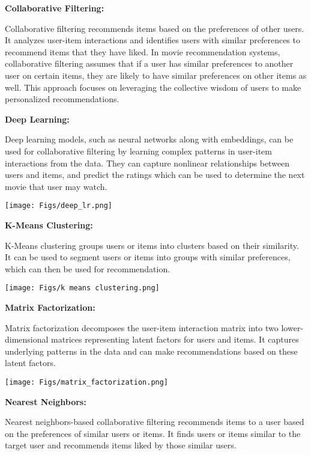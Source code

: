 \documentclass[a4paper]{article}
\theoremstyle{plain}
\theoremstyle{definition}
\begin{document}
\bigskip

\textbf{\Large Collaborative Filtering:}
\bigskip


Collaborative filtering recommends items based on the preferences of other users. It analyzes user-item interactions and identifies users with similar preferences to recommend items that they have liked. In movie recommendation systems, collaborative filtering assumes that if a user has similar preferences to another user on certain items, they are likely to have similar preferences on other items as well. This approach focuses on leveraging the collective wisdom of users to make personalized recommendations.

\bigskip

\textbf{\large \color[RGB]{50,50,50} Deep Learning:}

Deep learning models, such as neural networks along with embeddings, can be used for collaborative filtering by learning complex patterns in user-item interactions from the data. They can capture nonlinear relationships between users and items, and predict the ratings which can be used to determine the next movie that user may watch.

\texttt{[image: Figs/deep\_lr.png]}

\bigskip
\textbf{\large \color[RGB]{50,50,50} K-Means Clustering:}

K-Means clustering groups users or items into clusters based on their similarity. It can be used to segment users or items into groups with similar preferences, which can then be used for recommendation.

\texttt{[image: Figs/k means clustering.png]}

\bigskip
\textbf{\large \color[RGB]{50,50,50} Matrix Factorization:}


Matrix factorization decomposes the user-item interaction matrix into two lower-dimensional matrices representing latent factors for users and items. It captures underlying patterns in the data and can make recommendations based on these latent factors.

\texttt{[image: Figs/matrix\_factorization.png]}

\bigskip
\textbf{\large \color[RGB]{50,50,50} Nearest Neighbors:}

Nearest neighbors-based collaborative filtering recommends items to a user based on the preferences of similar users or items. It finds users or items similar to the target user and recommends items liked by those similar users.
\end{document}
